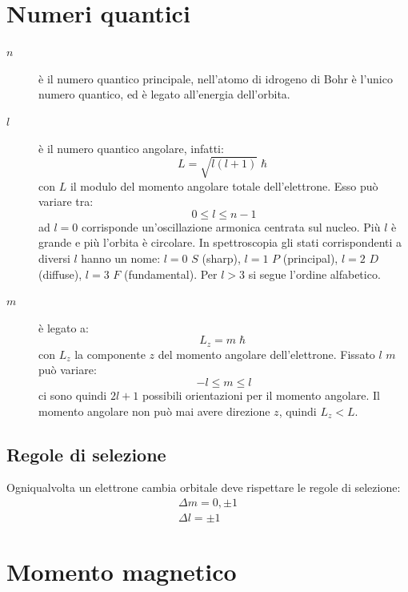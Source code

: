 \section{Numeri quantici}
\begin{description}
\item[$n$]
è il numero quantico principale, nell'atomo di idrogeno di Bohr è l'unico numero quantico, ed è legato all'energia dell'orbita.
\item[$l$]
è il numero quantico angolare, infatti:
\begin{equation}
L=\sqrt{l(l+1)}\hslash
\end{equation}
con $L$ il modulo del momento angolare totale dell'elettrone. Esso può variare tra:
\begin{equation}
0\leq l\leq n-1
\end{equation}
ad $l=0$ corrisponde un'oscillazione armonica centrata sul nucleo. Più $l$ è grande e più l'orbita è circolare. In spettroscopia gli stati corrispondenti a diversi $l$ hanno un nome: $l=0$ $S$ (sharp), $l=1$ $P$ (principal), $l=2$ $D$ (diffuse), $l=3$ $F$ (fundamental). Per $l>3$ si segue l'ordine alfabetico.
\item[$m$]
 è legato a:
\begin{equation}
L_z=m\hslash
\end{equation}
con $L_z$ la componente $z$ del momento angolare dell'elettrone. Fissato $l$ $m$ può variare:
\begin{equation}
-l\leq m\leq l
\end{equation}
ci sono quindi $2l+1$ possibili orientazioni per il momento angolare. Il momento angolare non può mai avere direzione $z$, quindi $L_z<L$.
\end{description}
\subsection{Regole di selezione}
Ogniqualvolta un elettrone cambia orbitale deve rispettare le regole di selezione:
\begin{subequations}
\begin{gather}
\Delta m=0,\pm 1\\
\Delta l=\pm 1
\end{gather}
\end{subequations}
\section{Momento magnetico}
